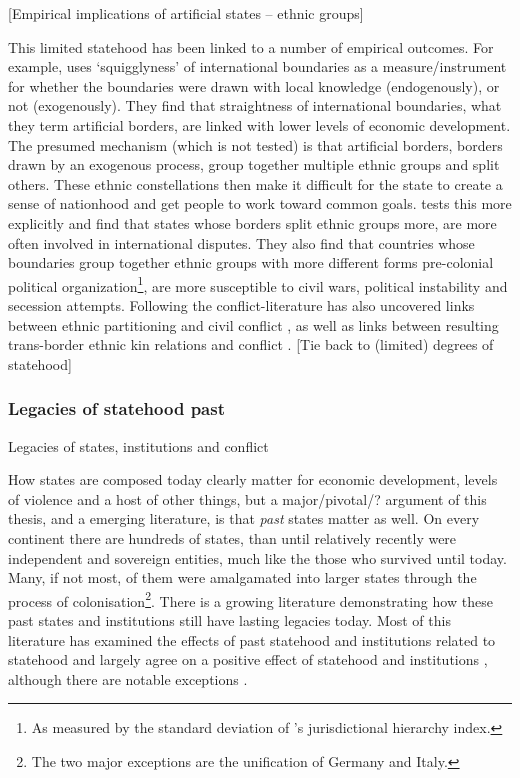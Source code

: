 \documentclass[12pt]{article}
\begin{document}
[Empirical implications of artificial states -- ethnic groups]

This limited statehood has been linked to a number of empirical outcomes. For
example, \citet{Alesina2011} uses `squigglyness' of international boundaries as
a measure/instrument for whether the boundaries were drawn with local knowledge
(endogenously), or not (exogenously). They find that straightness of
international boundaries, what they term artificial borders, are linked with
lower levels of economic development. The presumed mechanism (which is not
tested) is that artificial borders, borders drawn by an exogenous process, group
together multiple ethnic groups and split others. These ethnic constellations
then make it difficult for the state to create a sense of nationhood and get
people to work toward common goals. \citet{Englebert2002} tests this more
explicitly and find that states whose borders split ethnic groups more, are more
often involved in international disputes. They also find that countries whose
boundaries group together ethnic groups with more different forms pre-colonial
political organization\footnote{As measured by the standard deviation of
\citet{Murdock1967}'s jurisdictional hierarchy index.}, are more susceptible to
civil wars, political instability and secession attempts. Following
\citet{Englebert2002} the conflict-literature has also uncovered links between
ethnic partitioning and civil conflict \citep{Ito2020}, as well as links between
resulting trans-border ethnic kin relations and conflict \citep{Cederman2013,
Salehyan2009, Weidmann2015}. [Tie back to (limited) degrees of statehood]

\subsubsection{Legacies of statehood past} \label{Legacies} 

Legacies of states, institutions and conflict

How states are composed today clearly matter for economic development, levels of
violence and a host of other things, but a major/pivotal/? argument of this
thesis, and a emerging literature, is that \textit{past} states matter as well.
On every continent there are hundreds of states, than until relatively recently
were independent and sovereign entities, much like the those who survived until
today. Many, if not most, of them were amalgamated into larger states through
the process of colonisation\footnote{The two major exceptions are the
unification of Germany and Italy.}. There is a growing literature demonstrating
how these past states and institutions still have lasting legacies today. Most
of this literature has examined the effects of past statehood
\citep{Bockstette2002, Borcan2018} and institutions related to statehood
\citep{Michalopoulos2013, Michalopoulos2018, Englebert2000} and largely agree on
a positive effect of statehood and institutions \citep{Nunn_2020,
Michalopoulos2016}, although there are notable exceptions \citep{Acemoglu_2002}.
\end{document}
